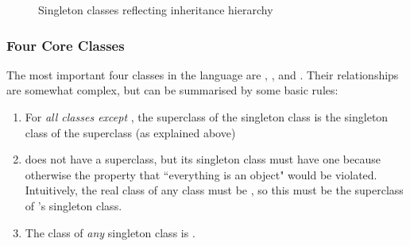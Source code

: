 \begin{figure}
\begin{center}
\caption{Singleton classes reflecting inheritance hierarchy}
\label{fig:singleton_class_inheritance}
\end{center}
\end{figure}

\subsubsection{Four Core Classes}

The most important four classes in the language are , ,  and . Their relationships are somewhat complex, but can be summarised by some basic rules:

\begin{enumerate}
  \item For \textit{all classes except }, the superclass of the singleton class is the singleton class of the superclass (as explained above)
  \item {} does not have a superclass, but its singleton class must have one because otherwise the property that ``everything is an object" would be violated. Intuitively, the real class of any class must be , so this must be the superclass of 's singleton class.
  \item The class of \textit{any} singleton class is .
\end{enumerate}

